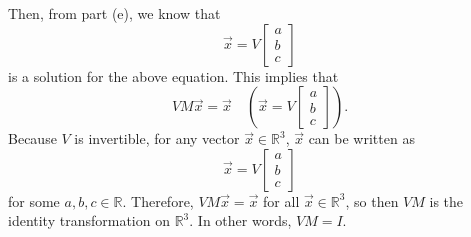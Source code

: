 \documentclass[letter]{article}
\newcommand{\R}{\mathbb{R}}
\newcommand{\mat}[1]{\begin{bmatrix}#1\end{bmatrix}}
\newenvironment{answer}{
	\begin{adjustwidth}{8mm}{} \vspace{2mm}}{\end{adjustwidth} \vspace{2mm}
}
\theoremstyle{plain}
\theoremstyle{definition}
\theoremstyle{remark}
\begin{document}
\begin{enumerate}
\begin{enumerate}
\begin{answer}
\[					\]
					Then, from part (e), we know that
					\[
					\vec{x} = V\mat{a\\b\\c}
					\]
					is a solution for the above equation. This implies that
					\[
					VM\vec{x} = \vec{x} \quad \left( \vec{x} = V\mat{a\\b\\c}\right). 
					\]
					Because $V$ is invertible, for any vector $\vec{x} \in \R^3$, $\vec{x}$ can be written as
					\[
					\vec{x} = V\mat{a\\b\\c}
					\]
					for some $a,b,c \in \R$. Therefore, $VM\vec{x} = \vec{x}$ for all $\vec{x} \in \R^3$, so then $VM$ is the identity transformation on $\R^3$. In other words, $VM = I$. 
				\end{answer}
			\end{enumerate}


\end{enumerate}
\end{document}

